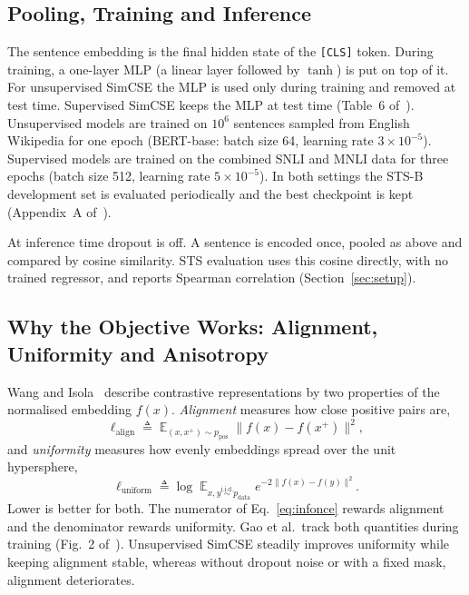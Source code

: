 \subsection{Pooling, Training and Inference}
\label{sec:method-pooling}

The sentence embedding is the final hidden state of the \texttt{[CLS]} token.
During training, a one-layer MLP (a linear layer followed by $\tanh$) is put on
top of it. For unsupervised SimCSE the MLP is used only during training and
removed at test time. Supervised SimCSE keeps the MLP at test time
(Table~6 of~\cite{gao-etal-2021-simcse}). Unsupervised models are trained on
$10^6$ sentences sampled from English Wikipedia for one epoch (BERT-base: batch
size 64, learning rate $3\times10^{-5}$). Supervised models are trained on the
combined SNLI and MNLI data for three epochs (batch size 512, learning rate
$5\times10^{-5}$). In both settings the STS-B development set is evaluated
periodically and the best checkpoint is kept (Appendix~A
of~\cite{gao-etal-2021-simcse}).

At inference time dropout is off. A sentence is encoded once, pooled as above
and compared by cosine similarity. STS evaluation uses this cosine directly,
with no trained regressor, and reports Spearman correlation
(Section~\ref{sec:setup}).

\subsection{Why the Objective Works: Alignment, Uniformity and Anisotropy}
\label{sec:method-theory}

Wang and Isola~\cite{pmlr-v119-wang20k} describe contrastive representations by
two properties of the normalised embedding $f(x)$. \emph{Alignment} measures how
close positive pairs are,
\begin{equation}
\ell_{\mathrm{align}} \triangleq
  \mathop{\mathbb{E}}_{(x,x^+)\sim p_{\mathrm{pos}}}
  \lVert f(x)-f(x^+)\rVert^2 ,
\end{equation}
and \emph{uniformity} measures how evenly embeddings spread over the unit
hypersphere,
\begin{equation}
\ell_{\mathrm{uniform}} \triangleq \log
  \mathop{\mathbb{E}}_{x,y \overset{\mathrm{i.i.d.}}{\sim} p_{\mathrm{data}}}
  e^{-2\lVert f(x)-f(y)\rVert^2}.
\end{equation}
Lower is better for both. The numerator of Eq.~\eqref{eq:infonce} rewards
alignment and the denominator rewards uniformity. Gao et al.\ track both
quantities during training (Fig.~2 of~\cite{gao-etal-2021-simcse}).
Unsupervised SimCSE steadily improves uniformity while keeping alignment
stable, whereas without dropout noise or with a fixed mask, alignment
deteriorates.

